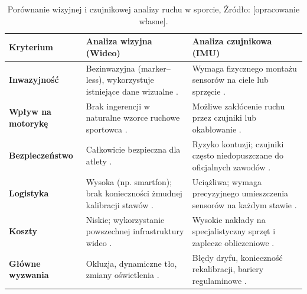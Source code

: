         \begin{table}[!h]
            \centering
            \caption{Porównanie wizyjnej i czujnikowej analizy ruchu w sporcie, Źródło: [opracowanie własne].}
            \label{tab:porownanie_metod}
            \small
            \begin{tabularx}{\textwidth} {| >{\raggedright\arraybackslash}p{4.2cm} | >{\RaggedRight\arraybackslash}X | >{\RaggedRight\arraybackslash}X |} \hline
                \textbf{Kryterium} & \textbf{Analiza wizyjna (Wideo)} & \textbf{Analiza czujnikowa (IMU)} \\ \hline
                \textbf{Inwazyjność} & Bezinwazyjna (marker–less), wykorzystuje istniejące dane wizualne \cite{barris2008review, host2022overview}. & Wymaga fizycznego montażu sensorów na ciele lub sprzęcie \cite{barris2008review}. \\ \hline
                \textbf{Wpływ na motorykę} & Brak ingerencji w naturalne wzorce ruchowe sportowca \cite{ahmadi2015toward}. & Możliwe zakłócenie ruchu przez czujniki lub okablowanie \cite{ahmadi2015toward}. \\ \hline
                \textbf{Bezpieczeństwo} & Całkowicie bezpieczna dla atlety \cite{barris2008review}. & Ryzyko kontuzji; czujniki często niedopuszczane do oficjalnych zawodów \cite{barris2008review}. \\ \hline
                \textbf{Logistyka} & Wysoka (np. smartfon); brak konieczności żmudnej kalibracji stawów \cite{host2022overview}. & Uciążliwa; wymaga precyzyjnego umieszczenia sensorów na każdym stawie \cite{ahmadi2015toward}. \\ \hline
                \textbf{Koszty} & Niskie; wykorzystanie powszechnej infrastruktury wideo \cite{barris2008review}. & Wysokie nakłady na specjalistyczny sprzęt i zaplecze obliczeniowe \cite{barris2008review}. \\ \hline
                \textbf{Główne wyzwania} & Okluzja, dynamiczne tło, zmiany oświetlenia \cite{barris2008review, host2022overview}. & Błędy dryfu, konieczność rekalibracji, bariery regulaminowe \cite{barris2008review, ahmadi2015toward}. \\ \hline
            \end{tabularx}
        \end{table}

